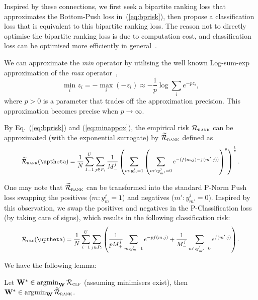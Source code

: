 Inspired by these connections, we first seek a bipartite ranking loss that approximates the Bottom-Push loss in~(\ref{eq:bprisk}),
then propose a classification loss that is equivalent to this bipartite ranking loss.
The reason not to directly optimise the bipartite ranking loss is due to computation cost,
and classification loss can be optimised more efficiently in general~\cite{ertekin2011equivalence}.

We can approximate the \emph{min} operator by utilising the well known Log-sum-exp approximation 
of the \emph{max} operator~\cite[p. 72]{boyd2004convex},
\begin{equation}
\label{eq:minappox}
\min_i z_i = -\max_i (-z_i) \approx -\frac{1}{p} \log \sum_i e^{-p z_i},
\end{equation}
where $p > 0$ is a parameter that trades off the approximation precision.
This approximation becomes precise when $p \to \infty$.

By Eq.~(\ref{eq:bprisk}) and (\ref{eq:minappox}), the empirical risk $\mathcal{R}_\textsc{rank}$ can be approximated
(with the exponential surrogate) by $\widetilde{\mathcal{R}}_\textsc{rank}$ defined as
\begin{equation}
\label{eq:rankapprox}
\resizebox{.9\linewidth}{!}{$
\begin{aligned}
\widetilde\RCal_\textsc{rank}(\uptheta)
= \frac{1}{N} \sum_{1=1}^U \sum_{j \in P_i} \frac{1}{M_-^j} \left( \sum_{m: y_m^j = 1} \left( \sum_{m': y_{m'}^j = 0} 
  e^{-(f(m, j) - f(m', j))} \right)^p \right)^\frac{1}{p}.
\end{aligned}
$}
\end{equation}


One may note that $\widetilde{\mathcal{R}}_\textsc{rank}$ can be transformed into the standard P-Norm Push loss swapping the
positives ($m: y_m^j = 1$) and negatives ($m': y_{m'}^j = 0$). %
Inspired by this observation, we swap the positives and negatives in the P-Classification loss (by taking care of signs),
which results in the following classification risk:
\begin{equation}
\label{eq:clfrisk}
\resizebox{.9\linewidth}{!}{$\displaystyle
\RCal_\textsc{clf}(\uptheta)
= \frac{1}{N} \sum_{i=1}^U \sum_{j \in P_i} \left(
  \frac{1}{p M_+^j} \sum_{m: y_m^j = 1} e^{-p f(m, j)}
  + \frac{1}{M_-^j} \sum_{m': y_{m'}^j = 0} e^{f(m', j)} \right).
$}
\end{equation}

We have the following lemma:
\begin{lemma}
\label{lm:rank2clf}
Let $\mathbf{W}^* \in \operatorname*{argmin}_{\mathbf{W}} \mathcal{R}_\textsc{clf}$ (assuming minimisers exist),
then $\mathbf{W}^* \in \operatorname*{argmin}_{\mathbf{W}} \widetilde{\mathcal{R}}_\textsc{rank}$.
\end{lemma}

